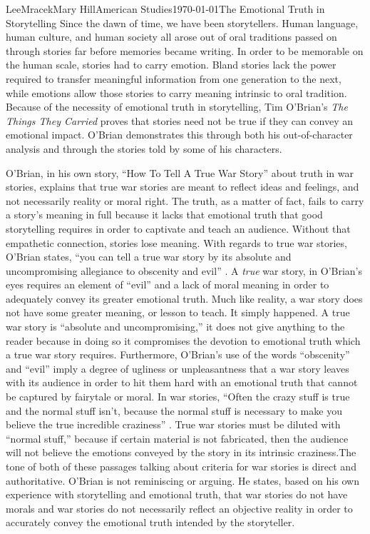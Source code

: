 \documentclass[letterpaper, 11pt]{article}
\begin{document}
\begin{mla}{Lee}{Mracek}{Mary Hill}{American Studies}{\today}{The Emotional Truth in Storytelling}
    Since the dawn of time, we have been storytellers. Human language, human culture, and human society all arose out of oral traditions passed on through stories far before memories became writing. In order to be memorable on the human scale, stories had to carry emotion. Bland stories lack the power required to transfer meaningful information from one generation to the next, while emotions allow those stories to carry meaning intrinsic to oral tradition. Because of the necessity of emotional truth in storytelling, Tim O'Brian's \textit{The Things They Carried} proves that stories need not be true if they can convey an emotional impact. O'Brian demonstrates this through both his out-of-character analysis and through the stories told by some of his characters.

    O'Brian, in his own story, ``How To Tell A True War Story'' about truth in war stories, explains that true war stories are meant to reflect ideas and feelings, and not necessarily reality or moral right. The truth, as a matter of fact, fails to carry a story's meaning in full because it lacks that emotional truth that good storytelling requires in order to captivate and teach an audience. Without that empathetic connection, stories lose meaning. With regards to true war stories, O'Brian states, ``you can tell a true war story by its absolute and uncompromising allegiance to obscenity and evil'' \cite[69]{TTTC}. A \textit{true} war story, in O'Brian's eyes requires an element of ``evil'' and a lack of moral meaning in order to adequately convey its greater emotional truth. Much like reality, a war story does not have some greater meaning, or lesson to teach. It simply happened. A true war story is ``absolute and uncompromising,'' it does not give anything to the reader because in doing so it compromises the devotion to emotional truth which a true war story requires. Furthermore, O'Brian's use of the words ``obscenity'' and ``evil'' imply a degree of ugliness or unpleasantness that a war story leaves with its audience in order to hit them hard with an emotional truth that cannot be captured by fairytale or moral. In war stories, ``Often the crazy stuff is true and the normal stuff isn't, because the normal stuff is necessary to make you believe the true incredible craziness'' \cite[71]{TTTC}. True war stories must be diluted with ``normal stuff,'' because if certain material is not fabricated, then the audience will not believe the emotions conveyed by the story in its intrinsic craziness.The tone of both of these passages talking about criteria for war stories is direct and authoritative. O'Brian is not reminiscing or arguing. He states, based on his own experience with storytelling and emotional truth, that war stories do not have morals and war stories do not necessarily reflect an objective reality in order to accurately convey the emotional truth intended by the storyteller.


\end{mla}
\end{document}
